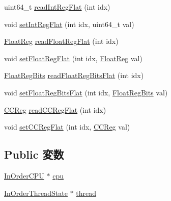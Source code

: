 \begin{DoxyCompactItemize}
\item 
uint64\_\-t \hyperlink{classInOrderThreadContext_aed7abd4afcb954f8612e4ef1fe73317a}{readIntRegFlat} (int idx)
\item 
void \hyperlink{classInOrderThreadContext_ae3b8c9c2c1ae95767f0703357957a3f8}{setIntRegFlat} (int idx, uint64\_\-t val)
\item 
\hyperlink{classThreadContext_a75484259f1855aabc8d74c6eb1cfe186}{FloatReg} \hyperlink{classInOrderThreadContext_aaa32dc9f4a8719a465c267fed47cbdc6}{readFloatRegFlat} (int idx)
\item 
void \hyperlink{classInOrderThreadContext_a71ec23ca2c029120932e5af4babc0da1}{setFloatRegFlat} (int idx, \hyperlink{classThreadContext_a75484259f1855aabc8d74c6eb1cfe186}{FloatReg} val)
\item 
\hyperlink{classThreadContext_aab5eeae86499f9bfe15ef79360eccc64}{FloatRegBits} \hyperlink{classInOrderThreadContext_a2fa29585c9694c9bffcce2a63f871759}{readFloatRegBitsFlat} (int idx)
\item 
void \hyperlink{classInOrderThreadContext_acd974292ff0461c2e94c0b5a1126b503}{setFloatRegBitsFlat} (int idx, \hyperlink{classThreadContext_aab5eeae86499f9bfe15ef79360eccc64}{FloatRegBits} val)
\item 
\hyperlink{classThreadContext_a0c9de550a32808e6a25b54b6c791d5ab}{CCReg} \hyperlink{classInOrderThreadContext_a78f8bb511732f8abab3bd11a18d32072}{readCCRegFlat} (int idx)
\item 
void \hyperlink{classInOrderThreadContext_a6dec2284dd5904f992642f24bb289f14}{setCCRegFlat} (int idx, \hyperlink{classThreadContext_a0c9de550a32808e6a25b54b6c791d5ab}{CCReg} val)
\end{DoxyCompactItemize}
\subsection*{Public 変数}
\begin{DoxyCompactItemize}
\item 
\hyperlink{classInOrderCPU}{InOrderCPU} $\ast$ \hyperlink{classInOrderThreadContext_a41d682c28d0f49e04393c52815808782}{cpu}
\item 
\hyperlink{classInOrderThreadState}{InOrderThreadState} $\ast$ \hyperlink{classInOrderThreadContext_ac297691c06a1cd4769d8eba7822395b9}{thread}
\end{DoxyCompactItemize}


